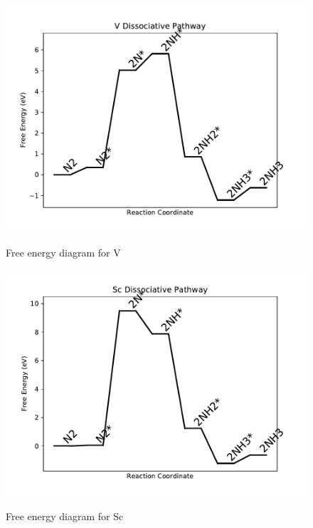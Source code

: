 \documentclass{article}
\begin{document}
\newpage
\begin{figure}
\includegraphics[width=1\linewidth]{data/plots/V_dissociative.pdf}
\label{fig:V_dissociative}
\caption{Free energy diagram for V}
\end{figure}

\begin{figure}
\includegraphics[width=1\linewidth]{data/plots/Sc_dissociative.pdf}
\label{fig:Sc_dissociative}
\caption{Free energy diagram for Sc}
\end{figure}
\end{document}
